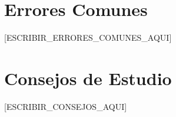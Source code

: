 \begin{teoria}

% 


\section{Errores Comunes}

[ESCRIBIR_ERRORES_COMUNES_AQUI]

% 
% 
% 


\section{Consejos de Estudio}

[ESCRIBIR_CONSEJOS_AQUI]




\end{teoria}
